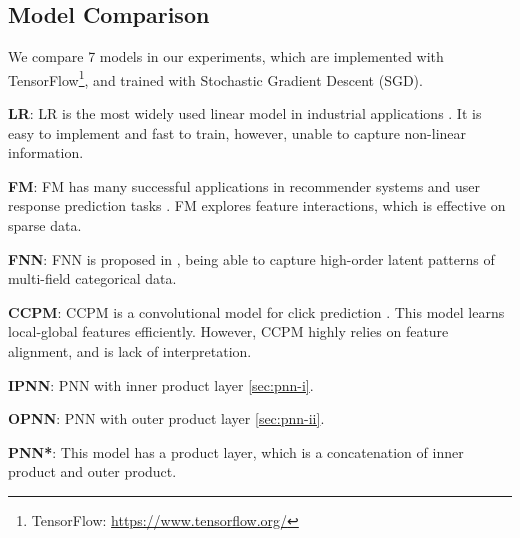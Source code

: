 \documentclass[conference]{IEEEtran}
\newcommand{\kan}[1]{{\bf \color{green} [[Kan says ``#1'']]}}
\begin{document}

\subsection{Model Comparison}
We compare 7 models in our experiments, which are implemented with TensorFlow\footnote{TensorFlow: \url{https://www.tensorflow.org/}}, and trained with Stochastic Gradient Descent (SGD).

\textbf{LR}: LR is the most widely used linear model in industrial applications \cite{mcmahan2013ad}. It is easy to implement and fast to train, however, unable to capture non-linear information.

\textbf{FM}: FM has many successful applications in recommender systems and user response prediction tasks \cite{rendle2010factorization}. FM explores feature interactions, which is effective on sparse data.

\textbf{FNN}: FNN is proposed in \cite{zhang2016deep}, being able to capture high-order latent patterns of multi-field categorical data.

\textbf{CCPM}: CCPM is a convolutional model for click prediction \cite{liu2015convolutional}. This model learns local-global features efficiently. However, CCPM highly relies on feature alignment, and is lack of interpretation.

\textbf{IPNN}: PNN with inner product layer \ref{sec:pnn-i}.

\textbf{OPNN}: PNN with outer product layer \ref{sec:pnn-ii}.

\textbf{PNN*}: This model has a product layer, which is a concatenation of inner product and outer product.


\end{document}
